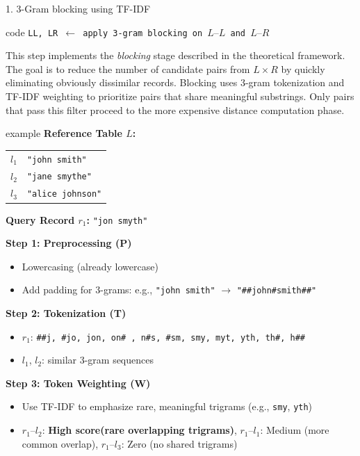 \documentclass[8pt]{beamer} %
\begin{document}
\begin{frame}{1. 3-Gram blocking using TF-IDF}
	

	\begin{beamercolorbox}[rounded=true, shadow=true, leftskip=1em, rightskip=1em]{code}
		\texttt{LL, LR $\leftarrow$ apply 3-gram blocking on $L–L$ and $L–R$}
	\end{beamercolorbox}
	
	
	\vspace{0.5em}
	
	This step implements the \textit{blocking} stage described in the theoretical framework. The goal is to reduce the number of candidate pairs from $L \times R$ by quickly eliminating obviously dissimilar records. Blocking uses 3-gram tokenization and TF-IDF weighting to prioritize pairs that share meaningful substrings. Only pairs that pass this filter proceed to the more expensive distance computation phase.
	
	

	\begin{beamercolorbox}[rounded=true, shadow=true, leftskip=1em, rightskip=1em]{example}
		\textbf{Reference Table $L$:}
		\begin{tabular}{ll}
			$l_1$ & \texttt{"john smith"} \\
			$l_2$ & \texttt{"jane smythe"} \\
			$l_3$ & \texttt{"alice johnson"}
		\end{tabular}
		

		\textbf{Query Record $r_1$:} \texttt{"jon smyth"}
		

		\textbf{Step 1: Preprocessing (P)}
		\begin{itemize}
			\item Lowercasing (already lowercase)
			\item Add padding for 3-grams: e.g., \texttt{"john smith"} $\rightarrow$ \texttt{"\#\#john\#smith\#\#"}
		\end{itemize}
		

		\textbf{Step 2: Tokenization (T)}
		\begin{itemize}
			\item $r_1$: \texttt{\#\#j, \#jo, jon, on\# , n\#s, \#sm, smy, myt, yth, th\#, h\#\#}
			\item $l_1$, $l_2$: similar 3-gram sequences
		\end{itemize}
		

		\textbf{Step 3: Token Weighting (W)}
		\begin{itemize}
			\item Use TF-IDF to emphasize rare, meaningful trigrams (e.g., \texttt{smy}, \texttt{yth})
			\item $r_1$–$l_2$: \textbf{High score(rare overlapping trigrams)}, $r_1$–$l_1$: Medium (more common overlap), $r_1$–$l_3$: Zero (no shared trigrams)
		\end{itemize}
		


\end{beamercolorbox}
\end{frame}
\end{document}

